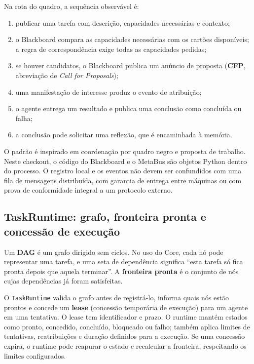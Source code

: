 \begin{processo}
Na rota do quadro, a sequência observável é:
\begin{enumerate}[leftmargin=1.4em,itemsep=1pt]
  \item publicar uma tarefa com descrição, capacidades necessárias e contexto;
  \item o Blackboard compara as capacidades necessárias com os cartões
        disponíveis; a regra de correspondência exige todas as capacidades
        pedidas;
  \item se houver candidatos, o Blackboard publica um anúncio de proposta
        (\textbf{CFP}, abreviação de \emph{Call for Proposals});
  \item uma manifestação de interesse produz o evento de atribuição;
  \item o agente entrega um resultado e publica uma conclusão como concluída
        ou falha;
  \item a conclusão pode solicitar uma reflexão, que é encaminhada à memória.
\end{enumerate}
\end{processo}

\begin{descricao}
O padrão é inspirado em coordenação por quadro negro e proposta de trabalho.
Neste checkout, o código do Blackboard e o MetaBus são objetos Python dentro do
processo. O registro local e os eventos não devem ser confundidos com uma fila
de mensagens distribuída, com garantia de entrega entre máquinas ou com prova
de conformidade integral a um protocolo externo.
\end{descricao}

\subsection{TaskRuntime: grafo, fronteira pronta e concessão de execução}

\begin{conceito}
Um \textbf{DAG} é um grafo dirigido sem ciclos. No uso do Core, cada nó pode
representar uma tarefa, e uma seta de dependência significa ``esta tarefa só
fica pronta depois que aquela terminar''. A \textbf{fronteira pronta} é o
conjunto de nós cujas dependências já foram satisfeitas.
\end{conceito}

\begin{processo}
O \texttt{TaskRuntime} valida o grafo antes de registrá-lo, informa quais nós
estão prontos e concede um \textbf{lease} (concessão temporária de execução)
para um agente em uma tentativa. O lease tem identificador e prazo. O runtime
mantém estados como pronto, concedido, concluído, bloqueado ou falho; também
aplica limites de tentativas, reatribuições e duração definidos para a execução.
Se uma concessão expira, o runtime pode reapurar o estado e recalcular a
fronteira, respeitando os limites configurados.
\end{processo}

